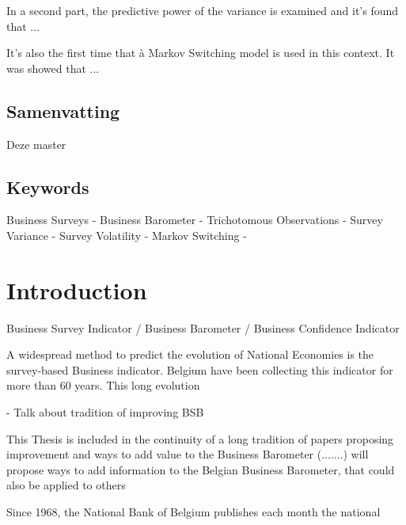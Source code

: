 \documentclass[12pt,a4paper,oneside]{book}
\begin{document}
In a second part, the predictive power of the variance is examined and it's found that ...

It's also the first time that à Markov Switching model is used in this context. It was showed that ...


\section*{Samenvatting}

Deze master


\section*{Keywords}
Business Surveys - 
Business Barometer -
Trichotomous Observations -
Survey Variance - 
Survey Volatility -
Markov Switching - 

\tableofcontents

\newpage
\setcounter{page}{0}


\chapter{Introduction}

Business Survey Indicator / Business Barometer / Business Confidence Indicator

A widespread method to predict the evolution of National Economies is the survey-based Business indicator. Belgium have been collecting this indicator for more than 60 years. This long evolution 

- Talk about tradition of improving BSB

This Thesis is included in the continuity of a long tradition of papers proposing improvement and ways to add value to the Business Barometer (.......) will propose ways to add information to the Belgian Business Barometer, that could also be applied to others

Since 1968, the National Bank of Belgium publishes each month the national 



\end{document}
